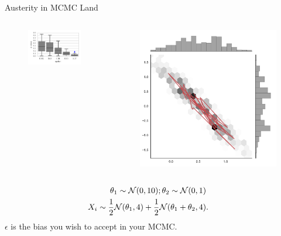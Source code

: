 \documentclass{beamer}
\begin{document}
  \begin{frame}{Austerity in MCMC Land}
\begin{columns}
        \begin{column}{.5\textwidth}
        \begin{figure}
           \includegraphics[width=\textwidth]{img/Heiko1} 
        \end{figure}
        \end{column}
        \begin{column}{.5\textwidth}
            \begin{figure}
           \includegraphics[width=\textwidth]{img/sgld_sample_wth_trace.pdf} 
        \end{figure}
        \end{column}
    \end{columns}
 \begin{align*}
 \theta_{1}\sim{\cal N}(0,10);\theta_{2}\sim{\cal N}(0,1)\\
 X_{i}\sim\frac{1}{2}{\cal N}(\theta_{1},4)+\frac{1}{2}{\cal N}(\theta_{1}+\theta_{2},4) & .
\end{align*}
$\epsilon$ is the bias you wish to accept in your MCMC. 
 \end{frame}
\end{document}
